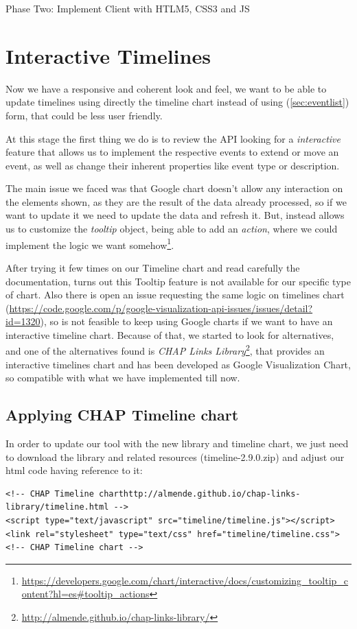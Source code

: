 \begin{part}{Phase Two: Implement Client with HTLM5, CSS3 and JS}
\chapter{Interactive Timelines}
Now we have a responsive and coherent look and feel, we want to be able to
update timelines using directly the timeline chart instead of using 
(\ref{sec:eventlist}) form, that could be less user friendly.

At this stage the first thing we do is to review the API looking for a
\emph{interactive} feature that allows us to implement the respective events to
extend or move an event, as well as change their inherent properties like event
type or description.

The main issue we faced was that Google chart doesn't allow any interaction on
the elements shown, as they are the result of the data already processed, so if we
want to update it we need to update the data and refresh it. But, instead allows
us to customize the \emph{tooltip} object, being able to add an \emph{action},
where we could implement the logic we want
somehow\footnote{\url{https://developers.google.com/chart/interactive/docs/customizing_tooltip_content?hl=es#tooltip_actions}}.

After trying it few times on our Timeline chart and read carefully the
documentation, turns out this Tooltip feature is not available for our specific
type of chart. Also there is open an issue requesting the same logic on
timelines chart
(\url{https://code.google.com/p/google-visualization-api-issues/issues/detail?id=1320}),
so is not feasible to keep using Google charts if we want to have an interactive
timeline chart. Because of that, we started to look for alternatives, and one of
the alternatives found is \emph{CHAP Links
Library}\footnote{\url{http://almende.github.io/chap-links-library/}}, that
provides an interactive timelines chart and has been developed as Google
Visualization Chart, so compatible with what we have implemented till now.

\section{Applying CHAP Timeline chart}
In order to update our tool with the new library and timeline chart, we just
need to download the library and related resources (timeline-2.9.0.zip) and
adjust our html code having reference to it:

\begin{lstlisting}[style=html,breaklines=true,caption=CHAP\ Link\
library,label=f_interactivetimelines_code]
<!-- CHAP Timeline charthttp://almende.github.io/chap-links-library/timeline.html -->
<script type="text/javascript" src="timeline/timeline.js"></script> 
<link rel="stylesheet" type="text/css" href="timeline/timeline.css">
<!-- CHAP Timeline chart -->
\end{lstlisting} 


\end{part}
